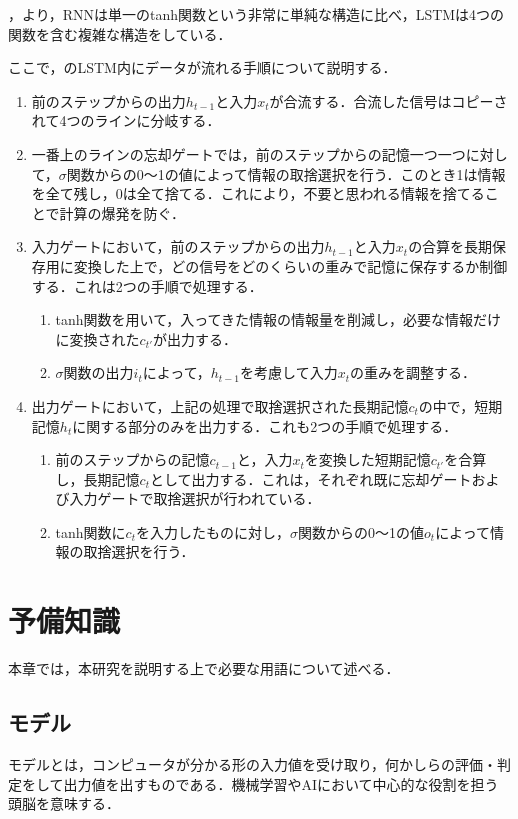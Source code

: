 \documentclass{eithesis}
\begin{document}
		，より，RNNは単一のtanh関数という非常に単純な構造に比べ，LSTMは4つの関数を含む複雑な構造をしている．

		ここで，のLSTM内にデータが流れる手順について説明する．
		\begin{enumerate}
			\item 前のステップからの出力$h_{t-1}$と入力$x_t$が合流する．合流した信号はコピーされて4つのラインに分岐する．
			\item 一番上のラインの忘却ゲートでは，前のステップからの記憶一つ一つに対して，$\sigma$関数からの0〜1の値によって情報の取捨選択を行う．このとき1は情報を全て残し，0は全て捨てる．これにより，不要と思われる情報を捨てることで計算の爆発を防ぐ．
			\item 入力ゲートにおいて，前のステップからの出力$h_{t-1}$と入力$x_t$の合算を長期保存用に変換した上で，どの信号をどのくらいの重みで記憶に保存するか制御する．これは2つの手順で処理する．
				\begin{enumerate}
					\item tanh関数を用いて，入ってきた情報の情報量を削減し，必要な情報だけに変換された$c_{t'}$が出力する．
					\item $\sigma$関数の出力$i_t$によって，$h_{t-1}$を考慮して入力$x_t$の重みを調整する．
				\end{enumerate}
			\item 出力ゲートにおいて，上記の処理で取捨選択された長期記憶$c_t$の中で，短期記憶$h_t$に関する部分のみを出力する．これも2つの手順で処理する．
				\begin{enumerate}
					\item 前のステップからの記憶$c_{t-1}$と，入力$x_t$を変換した短期記憶$c_{t'}$を合算し，長期記憶$c_t$として出力する．これは，それぞれ既に忘却ゲートおよび入力ゲートで取捨選択が行われている．
					\item tanh関数に$c_t$を入力したものに対し，$\sigma$関数からの0〜1の値$o_t$によって情報の取捨選択を行う．
				\end{enumerate}
		\end{enumerate}

\chapter{予備知識}
	本章では，本研究を説明する上で必要な用語について述べる．

	\section{モデル}
		モデルとは，コンピュータが分かる形の入力値を受け取り，何かしらの評価・判定をして出力値を出すものである．機械学習やAIにおいて中心的な役割を担う頭脳を意味する．
\end{document}

